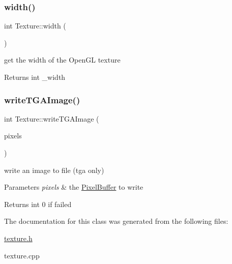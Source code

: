 \subsubsection{\texorpdfstring{width()}{width()}}
{\footnotesize\ttfamily int Texture\+::width (\begin{DoxyParamCaption}{ }\end{DoxyParamCaption})\hspace{0.3cm}{\ttfamily [inline]}}



get the width of the Open\+GL texture 

\begin{DoxyReturn}{Returns}
int \+\_\+width 
\end{DoxyReturn}
\mbox{\label{class_texture_afe34cd10fffd2afbd2d9748f2a21acbb}} 
\subsubsection{\texorpdfstring{write\+T\+G\+A\+Image()}{writeTGAImage()}}
{\footnotesize\ttfamily int Texture\+::write\+T\+G\+A\+Image (\begin{DoxyParamCaption}\item[{\hyperlink{struct_pixel_buffer}{Pixel\+Buffer} $\ast$}]{pixels }\end{DoxyParamCaption})}



write an image to file (tga only) 


\begin{DoxyParams}{Parameters}
{\em pixels} & the \hyperlink{struct_pixel_buffer}{Pixel\+Buffer} to write \\
\hline
\end{DoxyParams}
\begin{DoxyReturn}{Returns}
int 0 if failed 
\end{DoxyReturn}


The documentation for this class was generated from the following files\+:\begin{DoxyCompactItemize}
\item 
\hyperlink{texture_8h}{texture.\+h}\item 
texture.\+cpp\end{DoxyCompactItemize}
